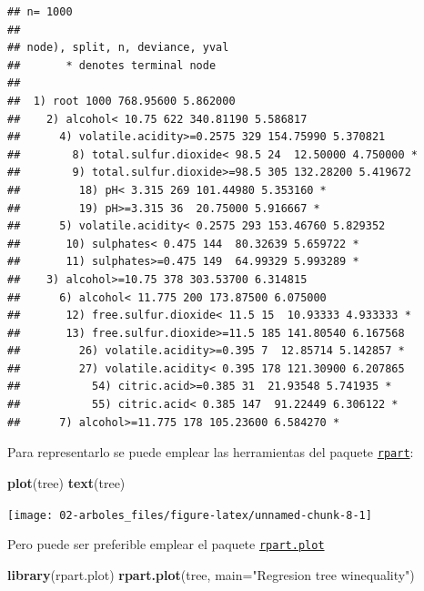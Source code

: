 \documentclass[
  spanish,
]{book}
\newenvironment{Shaded}{\begin{snugshade}}{\end{snugshade}}
\newcommand{\DataTypeTok}[1]{\textcolor[rgb]{0.13,0.29,0.53}{#1}}
\newcommand{\KeywordTok}[1]{\textcolor[rgb]{0.13,0.29,0.53}{\textbf{#1}}}
\newcommand{\NormalTok}[1]{#1}
\newcommand{\StringTok}[1]{\textcolor[rgb]{0.31,0.60,0.02}{#1}}
\theoremstyle{break}
\theoremstyle{definition}
\theoremstyle{definition}
\theoremstyle{definition}
\theoremstyle{remark}
\begin{document}
\begin{verbatim}
## n= 1000 
## 
## node), split, n, deviance, yval
##       * denotes terminal node
## 
##  1) root 1000 768.95600 5.862000  
##    2) alcohol< 10.75 622 340.81190 5.586817  
##      4) volatile.acidity>=0.2575 329 154.75990 5.370821  
##        8) total.sulfur.dioxide< 98.5 24  12.50000 4.750000 *
##        9) total.sulfur.dioxide>=98.5 305 132.28200 5.419672  
##         18) pH< 3.315 269 101.44980 5.353160 *
##         19) pH>=3.315 36  20.75000 5.916667 *
##      5) volatile.acidity< 0.2575 293 153.46760 5.829352  
##       10) sulphates< 0.475 144  80.32639 5.659722 *
##       11) sulphates>=0.475 149  64.99329 5.993289 *
##    3) alcohol>=10.75 378 303.53700 6.314815  
##      6) alcohol< 11.775 200 173.87500 6.075000  
##       12) free.sulfur.dioxide< 11.5 15  10.93333 4.933333 *
##       13) free.sulfur.dioxide>=11.5 185 141.80540 6.167568  
##         26) volatile.acidity>=0.395 7  12.85714 5.142857 *
##         27) volatile.acidity< 0.395 178 121.30900 6.207865  
##           54) citric.acid>=0.385 31  21.93548 5.741935 *
##           55) citric.acid< 0.385 147  91.22449 6.306122 *
##      7) alcohol>=11.775 178 105.23600 6.584270 *
\end{verbatim}

Para representarlo se puede emplear las herramientas del paquete \href{https://CRAN.R-project.org/package=rpart}{\texttt{rpart}}:

\begin{Shaded}
\begin{Highlighting}[]
\KeywordTok{plot}\NormalTok{(tree)}
\KeywordTok{text}\NormalTok{(tree)}
\end{Highlighting}
\end{Shaded}

\begin{center}\texttt{[image: 02-arboles\_files/figure-latex/unnamed-chunk-8-1]} \end{center}

Pero puede ser preferible emplear el paquete \href{https://CRAN.R-project.org/package=rpart.plot}{\texttt{rpart.plot}}

\begin{Shaded}
\begin{Highlighting}[]
\KeywordTok{library}\NormalTok{(rpart.plot)}
\KeywordTok{rpart.plot}\NormalTok{(tree, }\DataTypeTok{main=}\StringTok{"Regresion tree winequality"}\NormalTok{)  }
\end{Highlighting}
\end{Shaded}
\end{document}
